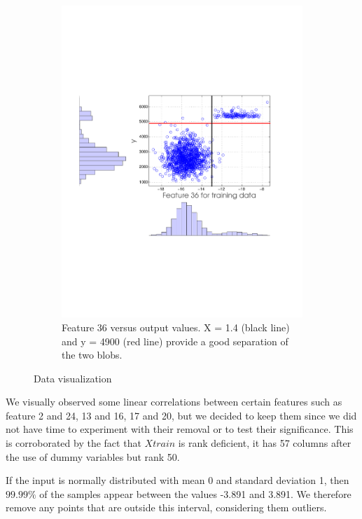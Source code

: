 \begin{figure}[ht]
\begin{subfigure}[b]{0.38\textwidth}
    \includegraphics[width=\textwidth]{figures/feature36_13_crop.pdf}
    \caption{Feature 36 versus output values. X = 1.4 (black line) and y = 4900 (red line)  provide a good separation of the two blobs.}
    \label{fig:feature36}
  \end{subfigure}
  \caption{Data visualization}
\end{figure}

We visually observed some linear correlations between certain features such as feature 2 and 24, 13 and 16, 17 and 20, but we decided to keep them since we did not have time to experiment with their removal or to test their significance. This is corroborated by the fact that $Xtrain$ is rank deficient, it has 57 columns after the use of dummy variables but rank 50.

If the input is normally distributed with mean 0 and standard deviation 1, then
 $99.99\%$ of the samples appear between the values -3.891 and 3.891. We therefore remove any points that are outside this interval, considering them outliers.

